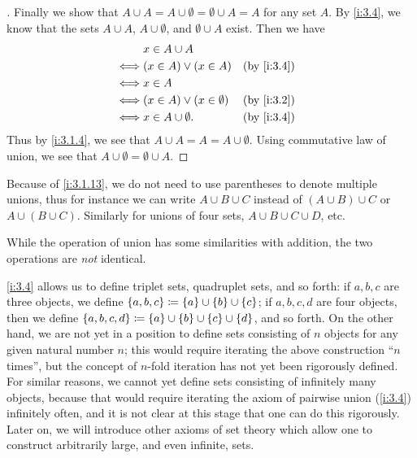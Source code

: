 \begin{proof}[]
  Finally we show that \(A \cup A = A \cup \emptyset = \emptyset \cup A = A\) for any set \(A\).
  By \cref{i:3.4}, we know that the sets \(A \cup A\), \(A \cup \emptyset\), and \(\emptyset \cup A\) exist.
  Then we have
  \begin{align*}
         & x \in A \cup A                                   \\
    \iff & (x \in A) \lor (x \in A)         &  & \by{i:3.4} \\
    \iff & x \in A                                          \\
    \iff & (x \in A) \lor (x \in \emptyset) &  & \by{i:3.2} \\
    \iff & x \in A \cup \emptyset.          &  & \by{i:3.4}
  \end{align*}
  Thus by \cref{i:3.1.4}, we see that \(A \cup A = A = A \cup \emptyset\).
  Using commutative law of union, we see that \(A \cup \emptyset = \emptyset \cup A\).
\end{proof}

\begin{note}
  Because of \cref{i:3.1.13}, we do not need to use parentheses to denote multiple unions, thus for instance we can write \(A \cup B \cup C\) instead of \((A \cup B) \cup C\) or \(A \cup (B \cup C)\).
  Similarly for unions of four sets, \(A \cup B \cup C \cup D\), etc.
\end{note}

\begin{rmk}\label{i:3.1.14}
  While the operation of union has some similarities with addition, the two operations are \emph{not} identical.
\end{rmk}

\begin{note}
  \cref{i:3.4} allows us to define triplet sets, quadruplet sets, and so forth: if \(a, b, c\) are three objects, we define \(\left\lbrace a, b, c\right\rbrace \coloneqq \left\lbrace a\right\rbrace \cup \left\lbrace b\right\rbrace \cup \left\lbrace c\right\rbrace\);
  if \(a, b, c, d\) are four objects, then we define \(\left\lbrace a, b, c, d\right\rbrace \coloneqq \left\lbrace a\right\rbrace \cup \left\lbrace b\right\rbrace \cup \left\lbrace c\right\rbrace \cup \left\lbrace d\right\rbrace\), and so forth.
  On the other hand, we are not yet in a position to define sets consisting of \(n\) objects for any given natural number \(n\);
  this would require iterating the above construction ``\(n\) times'', but the concept of \(n\)-fold iteration has not yet been rigorously defined.
  For similar reasons, we cannot yet define sets consisting of infinitely many objects, because that would require iterating the axiom of pairwise union (\cref{i:3.4}) infinitely often, and it is not clear at this stage that one can do this rigorously.
  Later on, we will introduce other axioms of set theory which allow one to construct arbitrarily large, and even infinite, sets.
\end{note}

